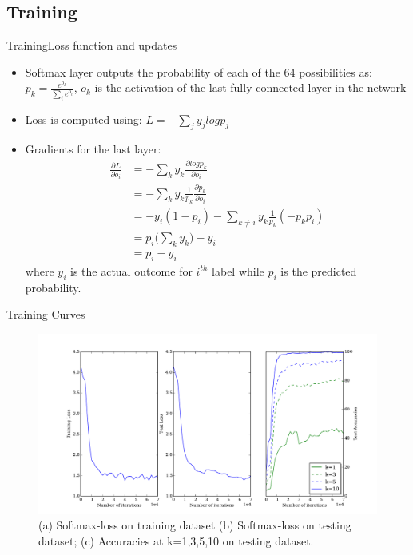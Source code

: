\documentclass[9pt, unknownkeysallowed]{beamer}
\begin{document}
\subsection{Training}
\begin{frame}{Training}{Loss function and updates}
\begin{itemize}
 \item Softmax layer outputs the probability of each of the 64 
possibilities as: $p_k=\frac{e^{o_k}}{\sum_i e^{o_i}}$, $o_k$ is the activation 
of the last fully connected layer in the network
  \item Loss is computed using: $L = - \sum_j y_j log p_j$
  \item Gradients for the last layer:
  \begin{align*}
 \frac{\partial L}{\partial o_i} &= -\sum_k y_k\frac{\partial log p_k}{\partial 
o_i} \\
&= -\sum_k y_k \frac{1}{p_k}\frac{\partial p_k}{\partial o_i}\\
&= -y_i(1-p_i) - \sum_{k\neq i} y_k \frac{1}{p_k}(-p_kp_i)\\
&= p_i\bigg(\sum_k y_k\bigg) - y_i\\
&= p_i-y_i
\end{align*}
 where $y_i$ is the actual outcome for $i^{th}$ label while $p_i$ is the 
predicted probability.
\end{itemize}
\end{frame}

\begin{frame}{Training Curves}
\begin{figure}
  \includegraphics[width=\textwidth,center]{../plots/learning_curve_new.pdf}
  \caption[Variation of the accuracies on test set while training]{
  (a) Softmax-loss on training dataset (b) Softmax-loss on 
testing dataset; (c) Accuracies at k=1,3,5,10 on testing dataset.}
  \label{figure:losses-accuracies}
\end{figure}
\end{frame}
\end{document}
